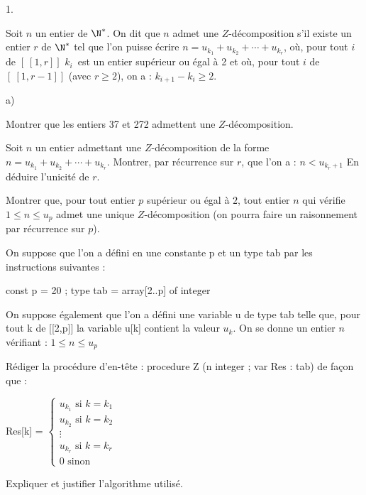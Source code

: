 \documentclass[11pt]{article}%
\begin{document}
\begin{noliste}{1.}
\item Soit $n$ un entier de $\N^{\ast}$. On dit que $n$ admet une $Z 
$-décomposition s'il existe un entier $r$ de $\N^{\ast}$ tel que
l'on puisse écrire $n = u_{k_{1}} + u_{k_{2}} + \cdots + u_{k_{r}}$,
où,
pour tout $i$ de $\left[ \ \left[ 1,r\right] \right] $ $k_{i}$\ est un
entier
supérieur ou égal à 2 et où, pour tout $i$ de $\left[ \ \left[
1,r-1\right] \right] $ (avec $r\geq2$), on a : $k_{i + 1}-k_{i}\geq2$.

\begin{noliste}{a)}
 \setlength{\itemsep}{2mm}
\item Montrer que les entiers 37 et 272 admettent une
$Z$-décomposition.

\item Soit $n$ un entier admettant une $Z$-décomposition de la forme $n
= u_{k_{1}} + u_{k_{2}} + \cdots + u_{k_{r}}.$ Montrer, par récurrence
sur $r$, que l'on a : $n<u_{k_{r} + 1}$ En déduire l'unicité de $r$.

\item Montrer que, pour tout entier $p$ supérieur ou égal à $2$,
tout entier $n$ qui vérifie $1\leq n\leq u_{p}$ admet une unique
$Z$-décomposition (on pourra faire un raisonnement par récurrence sur
$p$).
\end{noliste}

\item On suppose que l'on a défini en \Scilab{} une constante p et un
type
tab par les instructions suivantes :

const p = 20 ; type tab = array[2..p] of integer
\end{noliste}

On suppose également que l'on a défini une variable u de type tab
telle que, pour tout k de [[2,p]] la variable u[k] contient la valeur
$u_{k}$. On se donne un entier $n$ vérifiant : $1\leq n\leq u_{p}$

Rédiger la procédure d'en-tête : procedure Z (n integer ; var
Res : tab) de façon que :

Res[k] = $\left\{ 
\begin{array}{c}
u_{k_{1}}\text{ si }k = k_{1} \\
u_{k_{2}}\text{ si }k = k_{2} \\
\vdots \\
u_{k_{r}}\text{ si }k = k_{r} \\
0\text{ sinon}
\end{array}
\right. $

Expliquer et justifier l'algorithme utilisé.
\end{document}
